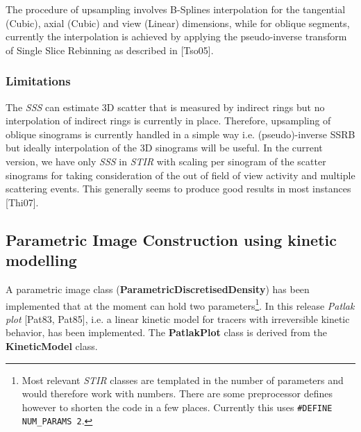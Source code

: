 \documentclass{article}
\begin{document}
The procedure of upsampling involves B-Splines interpolation for the tangential (Cubic), axial (Cubic) and
view (Linear) dimensions, while for oblique segments, currently the interpolation is achieved by applying the
pseudo-inverse transform of Single Slice Rebinning as described in [Tso05].


\subsubsection{Limitations}
The
\textit{SSS} can estimate 3D scatter that is measured by indirect rings but no interpolation of indirect
rings is currently in place. Therefore, upsampling of oblique sinograms is currently handled in a simple
way i.e. (pseudo)-inverse SSRB but ideally interpolation of the 3D sinograms will be useful. In the
current version, we have only \textit{SSS} in \textit{STIR} with scaling per sinogram of the scatter
sinograms for taking consideration of the out of field of view activity and multiple scattering
events. This generally seems to produce good results in most instances [Thi07].


\subsection{
Parametric Image Construction using kinetic modelling}
\label{sec:KineticModels}
A parametric image class (\textbf{ParametricDiscretisedDensity}) has been implemented that at the moment
can hold two parameters\footnote{Most relevant \textit{STIR} classes are templated in the number of parameters
and would therefore work with numbers. There are some preprocessor defines however to shorten the code in
a few places. Currently this uses \texttt{\#DEFINE NUM\_PARAMS 2}.}. 
In this release \textit{Patlak plot} [Pat83, Pat85], i.e. a linear kinetic
model for tracers with irreversible kinetic behavior, has been implemented. The \textbf{PatlakPlot} class
is derived from the \textbf{KineticModel} class.
\end{document}
